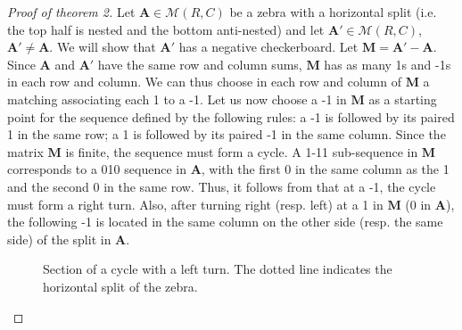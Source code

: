 \documentclass{article}
\newcommand{\MM}{\mathcal M}
\newcommand{\A}{\mathbf A}
\newcommand{\M}{\mathbf M}
\begin{document}
\begin{proof}[Proof of theorem 2]
Let $\A\in\MM(R,C)$ be a zebra with a horizontal split (i.e. the top half is nested and the bottom anti-nested) and let $\A'\in\MM(R,C)$, $\A'\neq \A$. We will show that $\A'$ has a negative checkerboard. Let $\M=\A'-\A$. Since $\A$ and $\A'$ have the same row and column sums, $\M$ has as many 1s and -1s in each row and column. We can thus choose in each row and column of $\M$ a matching associating each 1 to a -1. Let us now choose a -1 in $\M$ as a starting point for the sequence defined by the following rules: a -1 is followed by its paired 1 in the same row; a 1 is followed by its paired -1 in the same column. Since the matrix $\M$ is finite, the sequence must form a cycle. A 1-11 sub-sequence in $\M$ corresponds to a 010 sequence in $\A$, with the first 0 in the same column as the 1 and the second 0 in the same row. Thus, it follows from   that at a -1, the cycle must form a right turn. Also, after turning right (resp. left) at a 1 in $\M$ (0 in $\A$), the following -1 is located in the same column on the other side (resp. the same side) of the split in $\A$. 


\begin{figure}[ht]
    \begin{center}
    \end{center}
    \caption{Section of a cycle with a left turn. The dotted line indicates the horizontal split of the zebra.}
    \label{pan}
\end{figure}





\end{proof}
\end{document}
